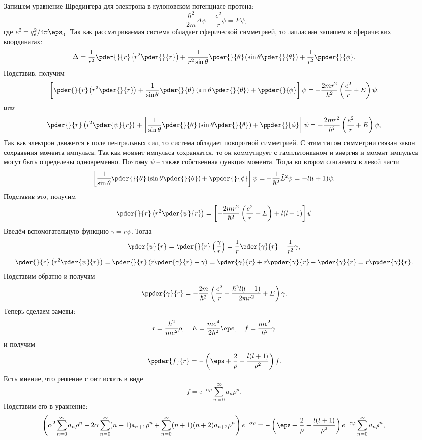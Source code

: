 Запишем уравнение Шредингера для электрона в кулоновском потенциале протона:
\[
	-\frac{\hbar^2}{2m}\Delta\psi - \frac{e^2}{r}\psi = E\psi,
\]
где \( e^2 = q_e^2/4\pi\eps_0 \). Так как рассматриваемая система обладает
сферической симметрией, то лапласиан запишем в сферических координатах:
\[
	\Delta = \frac{1}{r^2}\pder{}{r}\left(r^2\pder{}{r}\right) +
	\frac{1}{r^2\sin\theta}\pder{}{\theta}\left(\sin\theta\pder{}{\theta}\right) +
	\frac{1}{r^2}\ppder{}{\phi}.
\]
Подставив, получим
\[
	\left[\pder{}{r}\left(r^2\pder{}{r}\right) +
	\frac{1}{\sin\theta}\pder{}{\theta}\left(\sin\theta\pder{}{\theta}\right) +
	\ppder{}{\phi}\right]\psi =
	-\frac{2mr^2}{\hbar^2}\left(\frac{e^2}{r}+E\right)\psi,
\]
или
\[
	\pder{}{r}\left(r^2\pder{\psi}{r}\right) +
	\left[
	\frac{1}{\sin\theta}\pder{}{\theta}\left(\sin\theta\pder{}{\theta}\right) +
	\ppder{}{\phi}\right]\psi =
	-\frac{2mr^2}{\hbar^2}\left(\frac{e^2}{r}+E\right)\psi,
\]
Так как электрон движется в поле центральных сил, то система обладает
поворотной симметрией. С этим типом симметрии связан закон сохранения момента 
импульса. Так как момент импульса сохраняется, то он коммутирует
с гамильтонианом и энергия и момент импульса могут быть определены
одновременно. Поэтому \( \psi \) -- также собственная функция момента.
Тогда во втором слагаемом в левой части
\[
	\left[
	\frac{1}{\sin\theta}\pder{}{\theta}\left(\sin\theta\pder{}{\theta}\right) +
	\ppder{}{\phi}\right]\psi = -\frac{1}{\hbar^2}\hat{L}^2\psi = -l(l+1)\psi.
\]
Подставив это, получим
\[
	\pder{}{r}\left(r^2\pder{\psi}{r}\right) =
	\left[-\frac{2mr^2}{\hbar^2}\left(\frac{e^2}{r}+E\right) + l(l+1)\right]\psi
\]
Введём вспомогательную функцию \( \gamma = r\psi \). Тогда
\[
	\pder{\psi}{r} = \pder{}{r}\left(\frac{\gamma}{r}\right) =
	\frac{1}{r}\pder{\gamma}{r} - \frac{1}{r^2}\gamma,
\]
\[
	\pder{}{r}\left(r^2\pder{\psi}{r}\right) = \pder{}{r}\left(
	r\pder{\gamma}{r} - \gamma\right) = \pder{\gamma}{r} + r\ppder{\gamma}{r} -
	\pder{\gamma}{r} = r\ppder{\gamma}{r}.
\]
Подставим обратно и получим
\[
	\ppder{\gamma}{r} =
	-\frac{2m}{\hbar^2}
	\left(\frac{e^2}{r} - \frac{\hbar^2l(l+1)}{2mr^2} + E\right)\gamma.
\]
Теперь сделаем замены:
\[
	r = \frac{\hbar^2}{me^2}\rho,\quad E = \frac{me^4}{2\hbar^2}\eps,\quad
	f = \frac{me^2}{\hbar^2}\gamma
\]
и получим
\[
	\ppder{f}{r} = - \left(\eps + \frac{2}{\rho} -
	\frac{l(l+1)}{\rho^2}\right)f.
\]
Есть мнение, что решение стоит искать в виде
\[
	f = e^{-\alpha\rho}\sum_{n=0}^{\infty} a_n\rho^n.
\]
Подставим его в уравнение:
\[
	\left( \alpha^2 \sum_{n=0}^{\infty} a_n\rho^n -
	2\alpha\sum_{n=0}^{\infty} (n+1)a_{n+1}\rho^n +
	\sum_{n=0}^{\infty} (n+1)(n+2)a_{n+2}\rho^n \right)e^{-\alpha\rho}
	= - \left(\eps + \frac{2}{\rho} - \frac{l(l+1)}{\rho^2}\right)
	e^{-\alpha\rho}\sum_{n=0}^{\infty} a_n\rho^n,
\]
